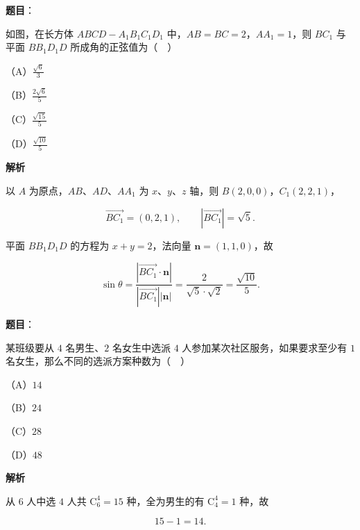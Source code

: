 \begin{answer}

\textbf{题目}：

如图，在长方体 $ABCD-A_1B_1C_1D_1$ 中，$AB=BC=2$，$AA_1=1$，则 $BC_1$ 与平面 $BB_1D_1D$ 所成角的正弦值为（　）

（A）$\frac{\sqrt6}{3}$

（B）$\frac{2\sqrt6}{5}$

（C）$\frac{\sqrt{15}}{5}$

（D）$\frac{\sqrt{10}}{5}$
\nopagebreak[4]
\begin{center}\end{center}
\nopagebreak[4]
\textbf{解析}

以 $A$ 为原点，$AB$、$AD$、$AA_1$ 为 $x$、$y$、$z$ 轴，则 $B(2,0,0)$，$C_1(2,2,1)$，

\nopagebreak[4]
\[\overrightarrow{BC_1}=(0,2,1),\qquad |\overrightarrow{BC_1}|=\sqrt5.\]

平面 $BB_1D_1D$ 的方程为 $x+y=2$，法向量 $\boldsymbol n=(1,1,0)$，故

\nopagebreak[4]
\[\sin\theta=\frac{|\overrightarrow{BC_1}\cdot\boldsymbol n|}{|\overrightarrow{BC_1}||\boldsymbol n|}=\frac2{\sqrt5\cdot\sqrt2}=\frac{\sqrt{10}}5.\]


\end{answer}
\begin{answer}

\textbf{题目}：

某班级要从 $4$ 名男生、$2$ 名女生中选派 $4$ 人参加某次社区服务，如果要求至少有 $1$ 名女生，那么不同的选派方案种数为（　）

（A）$14$

（B）$24$

（C）$28$

（D）$48$

\textbf{解析}

从 $6$ 人中选 $4$ 人共 $\mathrm C_6^4=15$ 种，全为男生的有 $\mathrm C_4^4=1$ 种，故

\nopagebreak[4]
\[15-1=14.\]


\end{answer}
